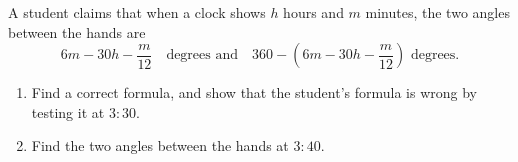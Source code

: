 A student claims that when a clock shows $h$ hours and $m$ minutes, the two angles between the hands are
\[6m-30h-\dfrac{m}{12}\quad\text{degrees and}\quad360-\left(6m-30h-\dfrac m{12}\right)\text{ degrees}.\]
\begin{enumerate}
\item[(a)] Find a correct formula, and show that the student's formula is wrong by testing it at $3{:}30$.
\item[(b)] Find the two angles between the hands at $3{:}40$.
\end{enumerate}
